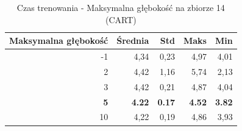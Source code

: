 \begin{table}[htbp]
\centering
\small
\setlength{\tabcolsep}{6pt}
\renewcommand{\arraystretch}{1.2}
\caption{Czas trenowania - Maksymalna głębokość na zbiorze 14 (CART)}
\label{tab:CART_max_depth_14_time}
\begin{tabular}{r|r|r|r|r}
\toprule
Maksymalna głębokość & Średnia & Std & Maks & Min \\
\hline
-1 & 4,34 & 0,23 & 4,97 & 4,01 \\
2 & 4,42 & 1,16 & 5,74 & 2,13 \\
3 & 4,42 & 0,21 & 4,87 & 4,04 \\
\textbf{5} & \textbf{4.22} & \textbf{0.17} & \textbf{4.52} & \textbf{3.82} \\
10 & 4,22 & 0,19 & 4,86 & 3,93 \\
\bottomrule
\end{tabular}
\end{table}